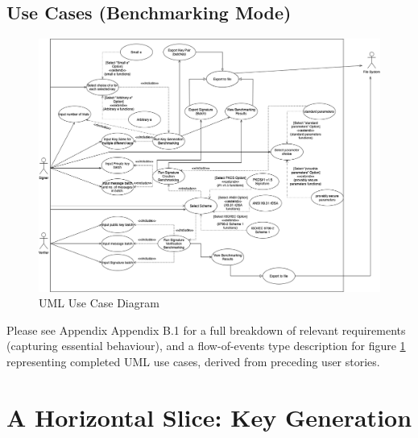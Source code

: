 \documentclass[]{final_report}
\theoremstyle{definition}
\begin{document}
\subsection{Use Cases (Benchmarking Mode)}
\begin{figure}[H]
    \centering
    \includegraphics[scale=0.4]{main_pictures/MAIN_USE-CASE.png}
    \caption{UML Use Case Diagram}
    \label{fig:uc}
\end{figure}

Please see Appendix Appendix B.1 for a full breakdown of relevant requirements (capturing essential behaviour), and a flow-of-events type description for figure \ref{fig:uc} representing completed UML use cases, derived from preceding user stories.



\section{A Horizontal Slice: Key Generation}
\end{document}
